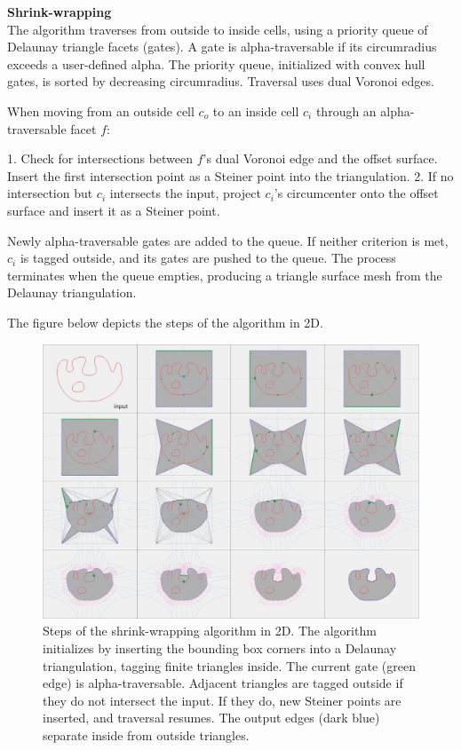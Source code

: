 \documentclass[12pt]{article}
\begin{document}
\textbf{Shrink-wrapping}\\
The algorithm traverses from outside to inside cells, using a priority queue of
 Delaunay triangle facets (gates). A gate is alpha-traversable if its circumradius
  exceeds a user-defined alpha. The priority queue, initialized with convex hull
   gates, is sorted by decreasing circumradius. Traversal uses dual Voronoi edges.

When moving from an outside cell \( c_o \) to an inside cell \( c_i \) through
an alpha-traversable facet \( f \):

1. Check for intersections between \( f \)’s dual Voronoi edge and the offset
surface. Insert the first intersection point as a Steiner point into the triangulation.
2. If no intersection but \( c_i \) intersects the input, project \( c_i \)’s
circumcenter onto the offset surface and insert it as a Steiner point.

Newly alpha-traversable gates are added to the queue. If neither criterion is
met, \( c_i \) is tagged outside, and its gates are pushed to the queue. The
process terminates when the queue empties, producing a triangle surface mesh from
 the Delaunay triangulation.

The figure below depicts the steps of the algorithm in 2D.
\begin{figure}[H]
    \centering
        \centering
        \includegraphics[width=\textwidth]{images/aw3_steps.jpg}
        \caption{Steps of the shrink-wrapping algorithm in 2D. The algorithm
        initializes by inserting the bounding box corners into a Delaunay
        triangulation, tagging finite triangles inside. The current gate (green
        edge) is alpha-traversable. Adjacent triangles are tagged outside if
        they do not intersect the input. If they do, new Steiner points are
        inserted, and traversal resumes. The output edges (dark blue) separate
        inside from outside triangles.
        }
\end{figure}
\end{document}
